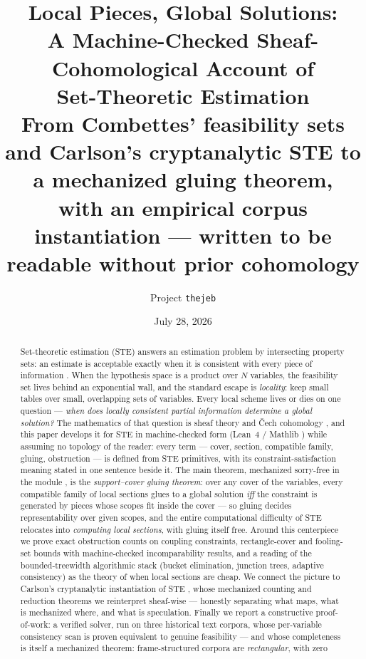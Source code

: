 \documentclass[11pt]{article}
\title{Local Pieces, Global Solutions:\\
A Machine-Checked Sheaf-Cohomological Account of\\
Set-Theoretic Estimation\\
\large From Combettes' feasibility sets and Carlson's cryptanalytic
STE to a mechanized gluing theorem,\\ with an empirical corpus
instantiation --- written to be readable without prior cohomology}
\author{Project \texttt{thejeb}}
\date{July 28, 2026}
\begin{document}
\maketitle

\begin{abstract}
Set-theoretic estimation (STE) answers an estimation problem by
intersecting property sets: an estimate is acceptable exactly when it
is consistent with every piece of information
\citep{combettes1993}.  When the hypothesis space is a product over
$N$ variables, the feasibility set lives behind an exponential wall,
and the standard escape is \emph{locality}: keep small tables over
small, overlapping sets of variables.  Every local scheme lives or
dies on one question --- \emph{when does locally consistent partial
information determine a global solution?}  The mathematics of that
question is sheaf theory and \v{C}ech cohomology
\citep{abramsky2011sheaf,abramsky2012cohomology}, and this paper
develops it for STE in machine-checked form (Lean~4 / Mathlib
\citep{moura2021,mathlib2020}) while assuming no topology of the
reader: every term --- cover, section, compatible family, gluing,
obstruction --- is defined from STE primitives, with its
constraint-satisfaction meaning stated in one sentence beside it.  The
main theorem, mechanized sorry-free in the module
, is the \emph{support--cover gluing theorem}:
over any cover of the variables, every compatible family of local
sections glues to a global solution \emph{iff} the constraint is
generated by pieces whose scopes fit inside the cover --- so gluing
decides representability over given scopes, and the entire
computational difficulty of STE relocates into \emph{computing local
sections}, with gluing itself free.  Around this centerpiece we prove
exact obstruction counts on coupling constraints, rectangle-cover and
fooling-set bounds with machine-checked incomparability results, and a
reading of the bounded-treewidth algorithmic stack (bucket
elimination, junction trees, adaptive consistency) as the theory of
when local sections are cheap.  We connect the picture to Carlson's
cryptanalytic instantiation of STE \citep{carlson2012}, whose
mechanized counting and reduction theorems we reinterpret sheaf-wise
--- honestly separating what maps, what is mechanized where, and
what is speculation.  Finally we report a constructive
proof-of-work: a verified solver, run on three historical text
corpora, whose per-variable consistency scan is proven equivalent to
genuine feasibility --- and whose completeness is itself a mechanized
theorem: frame-structured corpora are \emph{rectangular}, with zero

\end{abstract}
\end{document}
